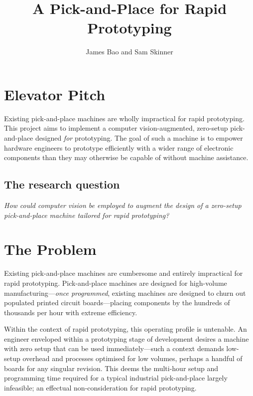 \documentclass [11pt]{article}
\title{A Pick-and-Place for Rapid Prototyping}
\author{James Bao and Sam Skinner}
\begin{document}
\maketitle

\section{Elevator Pitch}

Existing pick-and-place machines are wholly impractical for rapid prototyping.
This project aims to implement a computer vision-augmented, zero-setup pick-and-place designed \emph{for} prototyping.
The goal of such a machine is to empower hardware engineers to prototype efficiently with a wider range of electronic components than they may otherwise be capable of without machine assistance.

\subsection{The research question}

\emph{How could computer vision be employed to augment the design of a zero-setup pick-and-place machine tailored for rapid prototyping?}

\tableofcontents

\pagebreak
{}

\section{The Problem}

Existing pick-and-place machines are cumbersome and entirely impractical for rapid prototyping.
Pick-and-place machines are designed for high-volume manufacturing—\emph{once programmed}, existing machines are designed to churn out populated printed circuit boards—placing components by the hundreds of thousands per hour \cite{cite:ztar-ysm40r} with extreme efficiency.

Within the context of rapid prototyping, this operating profile is untenable.
An engineer enveloped within a prototyping stage of development desires a machine with zero setup that can be used immediately—such a context demands low-setup overhead and processes optimised for low volumes, perhaps a handful of boards for any singular revision.
This deems the multi-hour setup and programming time \cite{cite:setup-time-reduction} required for a typical industrial pick-and-place largely infeasible; an effectual non-consideration for rapid prototyping.
\end{document}
